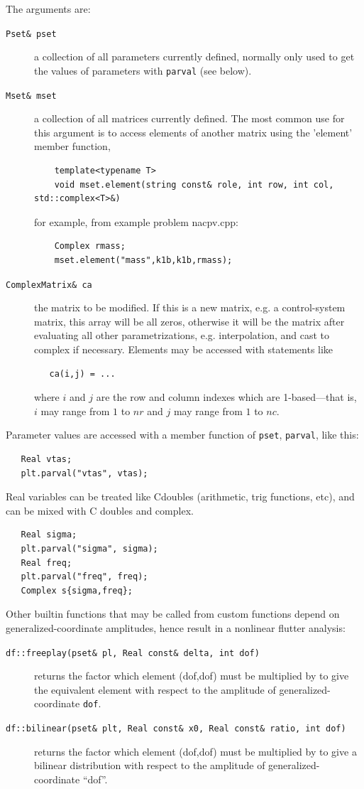 \documentclass[10pt,openany,twoside]{book}
\numberwithin{equation}{section}   %
\def\Cpp{{C\nolinebreak[4]\hspace{-.05em}\raisebox{.4ex}{\tiny\bf ++}}\:}
\newcommand{\Code}[1]{{\small\tt #1}}
\begin{document}
The arguments are:
\begin{description}
\item[\Code{Pset\& pset}] a collection of all parameters currently defined, normally
   only used to get the values of parameters with \Code{parval} (see below).
\item[\Code{Mset\& mset}] a collection of all matrices currently defined.
	The most common use for this argument is to access elements of another matrix
	using the 'element' member function,
	\begin{lstlisting}
	template<typename T>
	void mset.element(string const& role, int row, int col, std::complex<T>&)
	\end{lstlisting}
	for example, from example problem nacpv.cpp:
	\begin{lstlisting}
	Complex rmass;
	mset.element("mass",k1b,k1b,rmass);
	\end{lstlisting}
\item[\Code{ComplexMatrix\& ca}] the matrix to be modified. If this is a
new matrix, e.g. a control-system matrix, this array will be all zeros,
otherwise it will be the matrix after evaluating all other parametrizations,
e.g. interpolation, and cast to complex if necessary. Elements may be accessed
with statements like
\begin{lstlisting}
   ca(i,j) = ...
\end{lstlisting}
where $i$ and $j$ are the row and column indexes which are 1-based---that is,
$i$ may range from $1$ to $nr$ and $j$ may range from $1$ to $nc$.
\end{description}
\par
Parameter values are accessed with a member function of \Code{pset}, \Code{parval},
like this:
\begin{lstlisting}
   Real vtas;
   plt.parval("vtas", vtas);
\end{lstlisting}
Real variables can be treated like \Cpp doubles
(arithmetic, trig functions, etc), and can be mixed with \Cpp
doubles and complex.

\begin{lstlisting}
   Real sigma;
   plt.parval("sigma", sigma);
   Real freq;
   plt.parval("freq", freq);
   Complex s{sigma,freq};
\end{lstlisting}

Other builtin functions that may be called
from custom functions depend on generalized-coordinate amplitudes,
hence result in a nonlinear flutter analysis:
\begin{description}
\item[\Code{df::freeplay(pset\& pl, Real const\& delta, int dof)}]
   returns the factor which element (dof,dof) must be multiplied by to give
   the equivalent element with respect to the amplitude of
	generalized-coordinate \Code{dof}.
\item[\Code{df::bilinear(pset\& plt, Real const\& x0, Real const\& ratio, int dof)}]
returns the factor which element (dof,dof) must be multiplied by to give
a bilinear distribution with respect to the amplitude of generalized-coordinate
``dof''.
\end{description}
\end{document}
